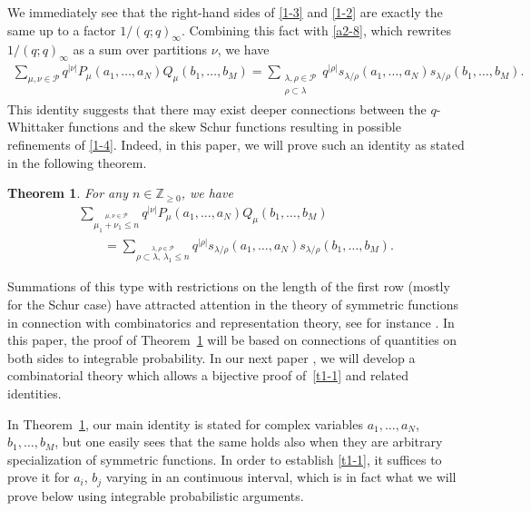 \documentclass[pdftex]{sigma}
\numberwithin{equation}{section}
\newtheorem{Theorem}{Theorem}[section]
\def\i{\infty}
\def\l{\lambda}
\def\Pe{\mathcal{P}}
\def\Z{\mathbb{Z}}
\begin{document}
 We immediately see that the right-hand sides of \eqref{1-3} and \eqref{1-2} are exactly the same up to a factor $1/(q;q)_{\i}$. Combining this fact with \eqref{a2-8}, which rewrites $1/(q;q)_{\i}$ as a sum over partitions $\nu$, we have
 \begin{align}
 \label{1-4}
 \sum_{\mu,\nu\in\Pe}q^{|\nu|}P_{\mu}(a_1,\dots,a_N)
 Q_{\mu}(b_1,\dots,b_M)
 =
 \sum_{\substack{\l,\rho\in\Pe\\ \rho\subset\l}}q^{|\rho|}s_{\l/\rho}(a_1,\dots,a_N)s_{\l/\rho}(b_1,\dots,b_M).
 \end{align}
 This identity suggests that there may exist deeper connections between the $q$-Whittaker functions and the skew Schur functions resulting in possible refinements of \eqref{1-4}.
 Indeed, in this paper, we will prove such an identity as stated in the following theorem.

 \begin{Theorem} \label{t1}
 For any $n\in\Z_{\ge 0}$, we have
 \begin{gather}
 \sum_{\stackrel{\mu,\nu\in\Pe}{\mu_1+\nu_1\le n}}q^{|\nu|}P_{\mu}(a_1,\dots,a_N)
 Q_{\mu}(b_1,\dots,b_M)\nonumber\\
 \qquad=
 \sum_{\stackrel{\l,\rho\in\Pe}{\rho\subset\l,\,\l_1\le n}}
 q^{|\rho|}s_{\l/\rho}(a_1,\dots,a_N)s_{\l/\rho}(b_1,\dots,b_M). \label{t1-1}
 \end{gather}
 \end{Theorem}
 Summations of this type with restrictions on the length of the first row (mostly for the Schur case) have attracted attention in the theory of symmetric functions in connection with combinatorics and representation theory, see for instance \cite{Baik-Rains2001algebraic,Gessel1990Cauchysum,Rains1998IncreasingSubsequence,Rains-Warnaar2015boundedLittlewoodidentities}.
 In this paper, the proof of Theorem~\ref{t1} will be based on connections of quantities on both sides to integrable probability. In our next paper \cite{ImamuraMucciconiSasamoto2021skewRSK}, we will develop a combinatorial theory which allows a bijective proof of~\eqref{t1-1} and related identities.

 \begin{Remark} \label{rem:intro}
 In Theorem~\ref{t1}, our main identity is stated for complex variables $a_1,\dots,a_N$, $b_1,\dots,b_M$, but one easily sees that the same holds also when they are arbitrary specialization of symmetric functions. In order to establish \eqref{t1-1}, it suffices to prove it for $a_i$, $b_j$ varying in an continuous interval, which is in fact what we will prove below using integrable probabilistic arguments.
 \end{Remark}
\end{document}
